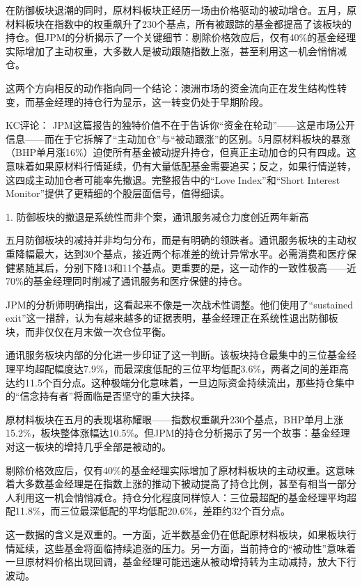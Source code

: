 \documentclass[11pt]{ctexart}
\begin{document}
在防御板块退潮的同时，原材料板块正经历一场由价格驱动的被动增仓。五月，原材料板块在指数中的权重飙升了230个基点，所有被跟踪的基金都提高了该板块的持仓。但JPM的分析揭示了一个关键细节：剔除价格效应后，仅有40\%的基金经理实际增加了主动权重，大多数人是被动跟随指数上涨，甚至利用这一机会悄悄减仓。

这两个方向相反的动作指向同一个结论：澳洲市场的资金流向正在发生结构性转变，而基金经理的持仓行为显示，这一转变仍处于早期阶段。

KC评论： JPM这篇报告的独特价值不在于告诉你“资金在轮动”——这是市场公开信息——而在于它拆解了“主动加仓”与“被动跟涨”的区别。5月原材料板块的暴涨（BHP单月涨16\%）迫使所有基金被动提升持仓，但真正主动加仓的只有四成。这意味着如果原材料行情延续，仍有大量低配基金需要追买；反之，如果行情逆转，这四成主动加仓者可能率先撤退。完整报告中的“Love Index”和“Short Interest Monitor”提供了更精细的个股层面信号，值得细读。

1. 防御板块的撤退是系统性而非个案，通讯服务减仓力度创近两年新高

五月防御板块的减持并非均匀分布，而是有明确的领跌者。通讯服务板块的主动权重降幅最大，达到30个基点，接近两个标准差的统计异常水平。必需消费和医疗保健紧随其后，分别下降13和11个基点。更重要的是，这一动作的一致性极高——近70\%的基金经理同时削减了通讯服务和医疗保健的持仓。

JPM的分析师明确指出，这看起来不像是一次战术性调整。他们使用了“sustained exit”这一措辞，认为有越来越多的证据表明，基金经理正在系统性退出防御板块，而非仅仅在月末做一次仓位平衡。

通讯服务板块内部的分化进一步印证了这一判断。该板块持仓最集中的三位基金经理平均超配幅度达7.9\%，而最深度低配的三位平均低配3.6\%，两者之间的差距高达约11.5个百分点。这种极端分化意味着，一旦边际资金持续流出，那些持仓集中的“信念持有者”将面临是否坚守的重大抉择。

原材料板块在五月的表现堪称耀眼——指数权重飙升230个基点，BHP单月上涨15.2\%，板块整体涨幅达10.5\%。但JPM的持仓分析揭示了另一个故事：基金经理对这一板块的增持几乎全部是被动的。

剔除价格效应后，仅有40\%的基金经理实际增加了原材料板块的主动权重。这意味着大多数基金经理是在指数上涨的推动下被动提高了持仓比例，甚至有相当一部分人利用这一机会悄悄减仓。持仓分化程度同样惊人：三位最超配的基金经理平均超配11.8\%，而三位最深低配的平均低配20.6\%，差距约32个百分点。

这一数据的含义是双重的。一方面，近半数基金仍在低配原材料板块，如果板块行情延续，这些基金将面临持续追涨的压力。另一方面，当前持仓的“被动性”意味着一旦原材料价格出现回调，基金经理可能迅速从被动增持转为主动减持，放大下行波动。
\end{document}
